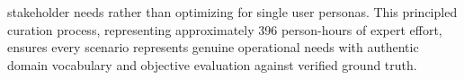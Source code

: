 \documentclass[sigconf]{acmart}
\begin{document}
stakeholder needs rather than optimizing for single user personas. This principled curation process, representing approximately 396 person-hours of expert effort, ensures every scenario represents genuine operational needs with authentic domain vocabulary and objective evaluation against verified ground truth.

\end{document}
